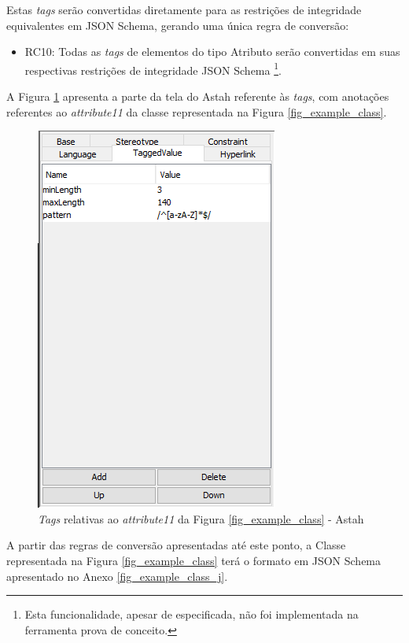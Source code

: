 Estas \textit{tags} serão convertidas diretamente para as restrições de integridade equivalentes em JSON Schema, gerando uma única regra de conversão:

\begin{itemize}
    \item RC10: Todas as \textit{tags} de elementos do tipo Atributo serão convertidas em suas respectivas restrições de integridade JSON Schema \footnote{Esta funcionalidade, apesar de especificada, não foi implementada na ferramenta prova de conceito.}.
\end{itemize}

A Figura \ref{fig_example_tags} apresenta a parte da tela do Astah referente às \textit{tags}, com anotações referentes ao \textit{attribute11} da classe representada na Figura \ref{fig_example_class}.

\begin{figure}[htb]
    \begin{center}
        \includegraphics[scale=0.7]{imagens/Example_Tags.png}
    \end{center}
	\caption{\label{fig_example_tags}\textit{Tags} relativas ao \textit{attribute11} da Figura \ref{fig_example_class} - Astah}
\end{figure}

A partir das regras de conversão apresentadas até este ponto, a Classe representada na Figura \ref{fig_example_class} terá o formato em JSON Schema apresentado no Anexo \ref{fig_example_class_j}.

